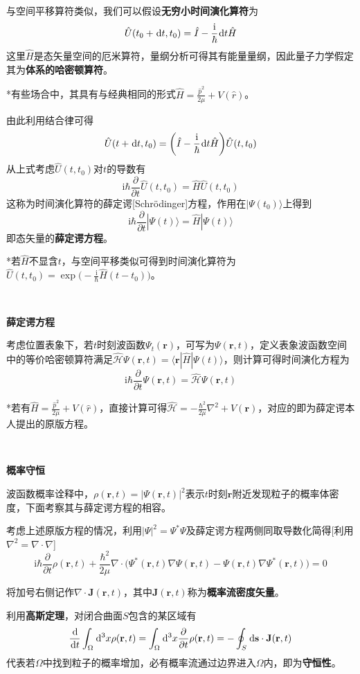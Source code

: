 \documentclass[a4paper,UTF8,fontset=windows]{ctexart}
\newcommand*{\dr}{\hspace{0.07em}\mathrm{d}}
\newcommand*{\ir}{\mathrm{i}}
\newcommand*{\ket}[1]{|#1\rangle}
\newcommand*{\blk}[3]{\langle#1|#2|#3\rangle}
\newcommand*{\br}{\mathbf{r}}
\newcommand*{\bj}{\mathbf{J}}
\begin{document}
与空间平移算符类似，我们可以假设\textbf{无穷小时间演化算符}为
$$\hat{U}(t_0+\dr t,t_0)=\hat{I}-\frac{\ir}{\hbar}\dr t\hat{H}$$
这里$\hat{H}$是态矢量空间的厄米算符，量纲分析可得其有能量量纲，因此量子力学假定其为\textbf{体系的哈密顿算符}。

*有些场合中，其具有与经典相同的形式$\hat{H}=\frac{\hat{p}^2}{2\mu}+V(\hat{r})$。

由此利用结合律可得
$$\hat{U}(t+\dr t,t_0)=\bigg(\hat{I}-\frac{\ir}{\hbar}\dr t\hat{H}\bigg)\hat{U}(t,t_0)$$
从上式考虑$\hat{U}(t,t_0)$对$t$的导数有
$$\ir\hbar\frac{\partial}{\partial t}\hat{U}(t,t_0)=\hat{H}\hat{U}(t,t_0)$$
这称为时间演化算符的薛定谔[Schr\"odinger]方程，作用在$\ket{\Psi(t_0)}$上得到
$$\ir\hbar\frac{\partial}{\partial t}\ket{\Psi(t)}=\hat{H}\ket{\Psi(t)}$$
即态矢量的\textbf{薛定谔方程}。

*若$\hat{H}$不显含$t$，与空间平移类似可得到时间演化算符为$\hat{U}(t,t_0)=\exp\big(-\frac{\ir}{\hbar}\hat{H}(t-t_0)\big)$。

\

\textbf{薛定谔方程}

考虑位置表象下，若$t$时刻波函数$\Psi_t(\br)$，可写为$\Psi(\br,t)$，定义表象波函数空间中的等价哈密顿算符满足$\hat{\mathcal{H}}\Psi(\br,t)=\blk{\br}{\hat{H}}{\Psi(t)}$，则计算可得时间演化方程为
$$\ir\hbar\frac{\partial}{\partial t}\Psi(\br,t)=\hat{\mathcal{H}}\Psi(\br,t)$$

*若有$\hat{H}=\frac{\hat{p}^2}{2\mu}+V(\hat{r})$，直接计算可得$\hat{\mathcal{H}}=-\frac{\hbar^2}{2\mu}\nabla^2+V(\br)$，对应的即为薛定谔本人提出的原版方程。

\

\textbf{概率守恒}

波函数概率诠释中，$\rho(\br,t)=|\Psi(\br,t)|^2$表示$t$时刻$\br$附近发现粒子的概率体密度，下面考察其与薛定谔方程的相容。

考虑上述原版方程的情况，利用$|\Psi|^2=\Psi^*\Psi$及薛定谔方程两侧同取导数化简得[利用$\nabla^2=\nabla\cdot\nabla$]
$$\ir\hbar\frac{\partial}{\partial t}\rho(\br,t)+\frac{\hbar^2}{2\mu}\nabla\cdot\big(\Psi^*(\br,t)\nabla\Psi(\br,t)-\Psi(\br,t)\nabla\Psi^*(\br,t)\big)=0$$

将加号右侧记作$\nabla\cdot\bj(\br,t)$，其中$\bj(\br,t)$称为\textbf{概率流密度矢量}。

利用\textbf{高斯定理}，对闭合曲面$S$包含的某区域有
$$\frac{\dr}{\dr t}\int_\Omega\dr^3x\rho(\br,t)=\int_\Omega\dr^3x\frac{\partial}{\partial t}\rho(\br,t)=-\oint_S\dr\mathbf{s}\cdot\bj(\br,t)$$
代表若$\Omega$中找到粒子的概率增加，必有概率流通过边界进入$\Omega$内，即为\textbf{守恒性}。
\end{document}
